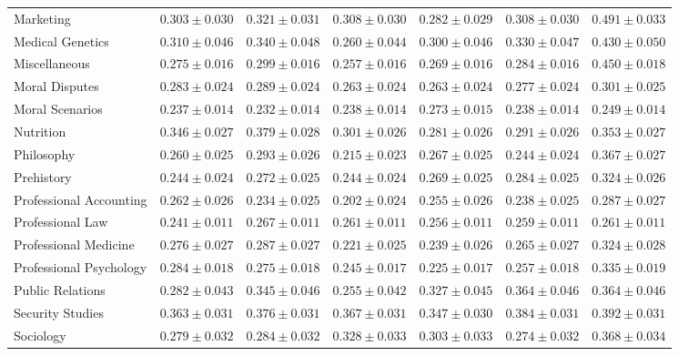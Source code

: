 \documentclass[11pt]{article}
\begin{document}
{\begin{landscape}
\begin{table}
\begin{tabular}{l c c c c c c }
Marketing & $0.303 \pm 0.030$ & $0.321 \pm 0.031$ & $0.308 \pm 0.030$ & $0.282 \pm 0.029$ & $0.308 \pm 0.030$ & $0.491 \pm 0.033$ \\ 
Medical Genetics & $0.310 \pm 0.046$ & $0.340 \pm 0.048$ & $0.260 \pm 0.044$ & $0.300 \pm 0.046$ & $0.330 \pm 0.047$ & $0.430 \pm 0.050$ \\ 
Miscellaneous & $0.275 \pm 0.016$ & $0.299 \pm 0.016$ & $0.257 \pm 0.016$ & $0.269 \pm 0.016$ & $0.284 \pm 0.016$ & $0.450 \pm 0.018$ \\ 
Moral Disputes & $0.283 \pm 0.024$ & $0.289 \pm 0.024$ & $0.263 \pm 0.024$ & $0.263 \pm 0.024$ & $0.277 \pm 0.024$ & $0.301 \pm 0.025$ \\ 
Moral Scenarios & $0.237 \pm 0.014$ & $0.232 \pm 0.014$ & $0.238 \pm 0.014$ & $0.273 \pm 0.015$ & $0.238 \pm 0.014$ & $0.249 \pm 0.014$ \\ 
Nutrition & $0.346 \pm 0.027$ & $0.379 \pm 0.028$ & $0.301 \pm 0.026$ & $0.281 \pm 0.026$ & $0.291 \pm 0.026$ & $0.353 \pm 0.027$ \\ 
Philosophy & $0.260 \pm 0.025$ & $0.293 \pm 0.026$ & $0.215 \pm 0.023$ & $0.267 \pm 0.025$ & $0.244 \pm 0.024$ & $0.367 \pm 0.027$ \\ 
Prehistory & $0.244 \pm 0.024$ & $0.272 \pm 0.025$ & $0.244 \pm 0.024$ & $0.269 \pm 0.025$ & $0.284 \pm 0.025$ & $0.324 \pm 0.026$ \\ 
Professional Accounting & $0.262 \pm 0.026$ & $0.234 \pm 0.025$ & $0.202 \pm 0.024$ & $0.255 \pm 0.026$ & $0.238 \pm 0.025$ & $0.287 \pm 0.027$ \\ 
Professional Law & $0.241 \pm 0.011$ & $0.267 \pm 0.011$ & $0.261 \pm 0.011$ & $0.256 \pm 0.011$ & $0.259 \pm 0.011$ & $0.261 \pm 0.011$ \\ 
Professional Medicine & $0.276 \pm 0.027$ & $0.287 \pm 0.027$ & $0.221 \pm 0.025$ & $0.239 \pm 0.026$ & $0.265 \pm 0.027$ & $0.324 \pm 0.028$ \\ 
Professional Psychology & $0.284 \pm 0.018$ & $0.275 \pm 0.018$ & $0.245 \pm 0.017$ & $0.225 \pm 0.017$ & $0.257 \pm 0.018$ & $0.335 \pm 0.019$ \\ 
Public Relations & $0.282 \pm 0.043$ & $0.345 \pm 0.046$ & $0.255 \pm 0.042$ & $0.327 \pm 0.045$ & $0.364 \pm 0.046$ & $0.364 \pm 0.046$ \\ 
Security Studies & $0.363 \pm 0.031$ & $0.376 \pm 0.031$ & $0.367 \pm 0.031$ & $0.347 \pm 0.030$ & $0.384 \pm 0.031$ & $0.392 \pm 0.031$ \\ 
Sociology & $0.279 \pm 0.032$ & $0.284 \pm 0.032$ & $0.328 \pm 0.033$ & $0.303 \pm 0.033$ & $0.274 \pm 0.032$ & $0.368 \pm 0.034$ \\ 

\end{tabular}
\end{table}
\end{landscape}}
\end{document}
